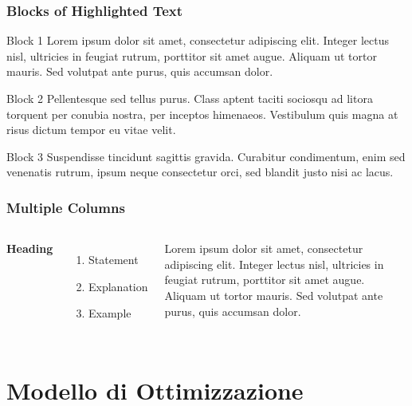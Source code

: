 \documentclass{beamer}
\begin{document}
\begin{frame}
	\frametitle{Blocks of Highlighted Text}
	\begin{block}{Block 1}
		Lorem ipsum dolor sit amet, consectetur adipiscing elit. Integer lectus nisl, ultricies in feugiat rutrum, porttitor sit amet augue. Aliquam ut tortor mauris. Sed volutpat ante purus, quis accumsan dolor.
	\end{block}
	
	\begin{block}{Block 2}
		Pellentesque sed tellus purus. Class aptent taciti sociosqu ad litora torquent per conubia nostra, per inceptos himenaeos. Vestibulum quis magna at risus dictum tempor eu vitae velit.
	\end{block}
	
	\begin{block}{Block 3}
		Suspendisse tincidunt sagittis gravida. Curabitur condimentum, enim sed venenatis rutrum, ipsum neque consectetur orci, sed blandit justo nisi ac lacus.
	\end{block}
\end{frame}


\begin{frame}
	\frametitle{Multiple Columns}
	\begin{columns}[c] %
		
		\textbf{Heading}
		\begin{enumerate}
			\item Statement
			\item Explanation
			\item Example
		\end{enumerate}
		
		Lorem ipsum dolor sit amet, consectetur adipiscing elit. Integer lectus nisl, ultricies in feugiat rutrum, porttitor sit amet augue. Aliquam ut tortor mauris. Sed volutpat ante purus, quis accumsan dolor.
		
	\end{columns}
\end{frame}

\section{Modello di Ottimizzazione}
\end{document}

